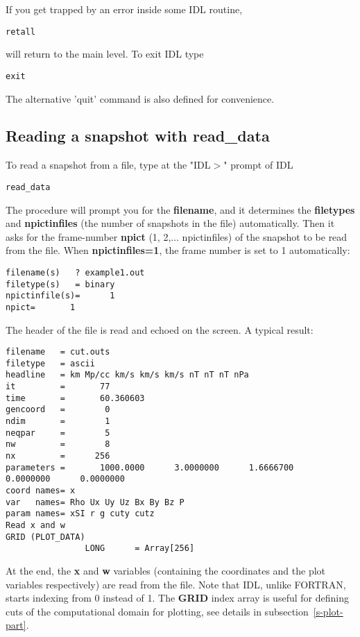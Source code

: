 \documentclass{article}
\begin{document}
   If you get trapped by an error inside some IDL routine,
\begin{verbatim}
retall
\end{verbatim}
   will return to the main level. To exit IDL type
\begin{verbatim}
exit
\end{verbatim}
   The alternative 'quit' command is also defined for convenience.

\subsection{Reading a snapshot with read\_data \label{s-readdata}}

   To read a snapshot from a file, type at the "IDL$>$" prompt of IDL
\begin{verbatim}
read_data
\end{verbatim}
   The procedure will prompt you for the {\bf filename}, 
   and it determines the {\bf filetypes} and {\bf npictinfiles}
   (the number of snapshots in the file) automatically. Then it asks for
   the frame-number {\bf npict} (1, 2,... npictinfiles) 
   of the snapshot to be read from the file. When {\bf npictinfiles=1},
   the frame number is set to 1 automatically:
\begin{verbatim}
filename(s)   ? example1.out
filetype(s)   = binary
npictinfile(s)=      1
npict=       1
\end{verbatim}
   The header of the file is read and echoed on the screen. 
   A typical result:
\begin{verbatim}
filename   = cut.outs
filetype   = ascii
headline   = km Mp/cc km/s km/s km/s nT nT nT nPa
it         =       77
time       =       60.360603
gencoord   =        0
ndim       =        1
neqpar     =        5
nw         =        8
nx         =      256
parameters =       1000.0000      3.0000000      1.6666700      0.0000000      0.0000000
coord names= x
var   names= Rho Ux Uy Uz Bx By Bz P
param names= xSI r g cuty cutz
Read x and w
GRID (PLOT_DATA)
                LONG      = Array[256]
\end{verbatim}
   At the end, the {\bf x} and {\bf w} variables (containing the coordinates 
   and the plot variables respectively) are read from the file. 
   Note that IDL, unlike FORTRAN, starts indexing from 0 instead of 1. 
   The {\bf GRID} index array is useful for defining
   cuts of the computational domain for plotting, see details 
   in subsection~\ref{s-plot-part}. 
\end{document}
